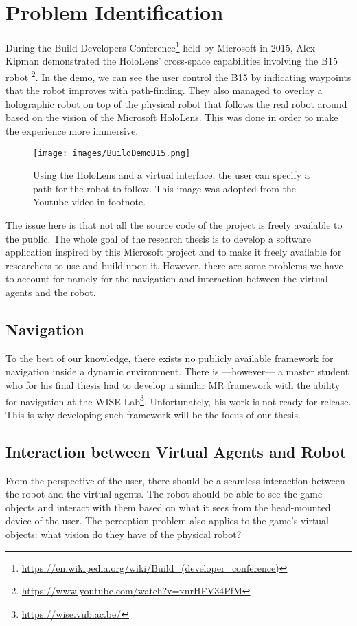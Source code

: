\newpage
\section{Problem Identification}
During the Build Developers Conference\footnote{\protect\url{https://en.wikipedia.org/wiki/Build\_(developer\_conference)}} held by Microsoft in 2015, Alex Kipman demonstrated the HoloLens' cross-space capabilities involving the B15 robot \footnote{\protect\url{https://www.youtube.com/watch?v=xnrHFV34PfM}}. In the demo, we can see the user control the B15 by indicating waypoints that the robot improves with path-finding. They also managed to overlay a holographic robot on top of the physical robot that follows the real robot around based on the vision of the Microsoft HoloLens. This was done in order to make the experience more immersive.
\begin{figure}[!htb]
	\texttt{[image: images/BuildDemoB15.png]}
	\captionsetup{width=0.8\textwidth}
	\centering
	\caption{Using the HoloLens and a virtual interface, the user can specify a path for the robot to follow. This image was adopted from the Youtube video in footnote. }
\end{figure}
\newline
The issue here is that not all the source code of the project is freely available to the public. The whole goal of the research thesis is to develop a software application inspired by this Microsoft project and to make it freely available for researchers to use and build upon it. However, there are some problems we have to account for namely for the navigation and interaction between the virtual agents and the robot.

\subsection{Navigation}
To the best of our knowledge, there exists no publicly available framework for navigation inside a dynamic environment. There is ---however--- a master student who for his final thesis had to develop a similar MR framework with the ability for navigation at the WISE Lab\footnote{\protect\url{https://wise.vub.ac.be/}}. Unfortunately, his work is not ready for release. This is why developing such framework will be the focus of our thesis. 

\subsection{Interaction between Virtual Agents and Robot}
From the perspective of the user, there should be a seamless interaction between the robot and the virtual agents. The robot should be able to see the game objects and interact with them based on what it sees from the head-mounted device of the user. The perception problem also applies to the game's virtual objects: what vision do they have of the physical robot? 

